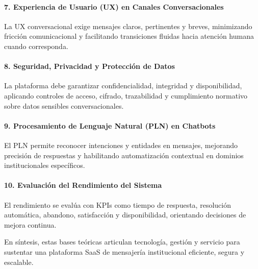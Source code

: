 \paragraph{7. Experiencia de Usuario (UX) en Canales Conversacionales}
La UX conversacional exige mensajes claros, pertinentes y breves, minimizando fricción comunicacional y facilitando transiciones fluidas hacia atención humana cuando corresponda.

\paragraph{8. Seguridad, Privacidad y Protección de Datos}
La plataforma debe garantizar confidencialidad, integridad y disponibilidad, aplicando controles de acceso, cifrado, trazabilidad y cumplimiento normativo sobre datos sensibles conversacionales.

\paragraph{9. Procesamiento de Lenguaje Natural (PLN) en Chatbots}
El PLN permite reconocer intenciones y entidades en mensajes, mejorando precisión de respuestas y habilitando automatización contextual en dominios institucionales específicos.

\paragraph{10. Evaluación del Rendimiento del Sistema}
El rendimiento se evalúa con KPIs como tiempo de respuesta, resolución automática, abandono, satisfacción y disponibilidad, orientando decisiones de mejora continua.

En síntesis, estas bases teóricas articulan tecnología, gestión y servicio para sustentar una plataforma SaaS de mensajería institucional eficiente, segura y escalable.
